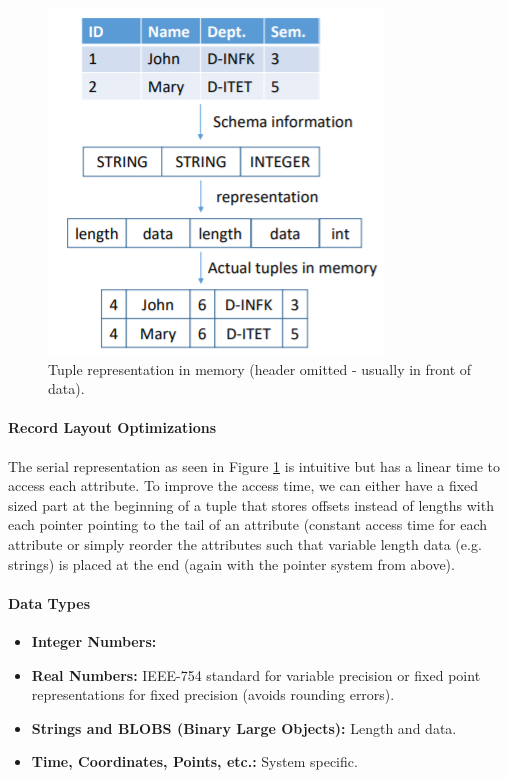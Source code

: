 \begin{figure}[h]
	\centering
	\includegraphics[scale=0.6]{images/2-tuple.PNG}
	\caption{Tuple representation in memory (header omitted - usually in front of data).}
	\label{fig:tuple}
\end{figure}

\paragraph{Record Layout Optimizations}
The serial representation as seen in Figure \ref{fig:tuple} is intuitive but has a linear time to access each attribute. To improve the access time, we can either have a fixed sized part at the beginning of a tuple that stores offsets instead of lengths with each pointer pointing to the tail of an attribute (constant access time for each attribute or simply reorder the attributes such that variable length data (e.g. strings) is placed at the end (again with the pointer system from above). %

\paragraph{Data Types}
\begin{itemize}
    \item \textbf{Integer Numbers:} %
    \item \textbf{Real Numbers:} IEEE-754 standard for variable precision or fixed point representations for fixed precision (avoids rounding errors). %
    \item \textbf{Strings and BLOBS (Binary Large Objects):} Length and data.
    \item \textbf{Time, Coordinates, Points, etc.:} System specific.
\end{itemize}

